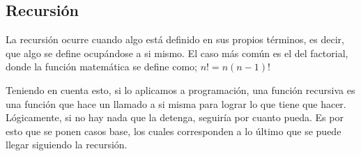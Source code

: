 \documentclass[letterpaper]{article}
\begin{document}
  \subsection{Recursi\'on}
  La recursi\'on ocurre cuando algo est\'a definido en sus propios t\'erminos,
  es decir, que algo se define ocup\'andose a si mismo. El caso m\'as com\'un es
  el del factorial, donde la funci\'on matem\'atica se define como;
  $n! = n(n-1)!$
  \par
  Teniendo en cuenta esto, si lo aplicamos a programaci\'on, una funci\'on recursiva
  es una funci\'on que hace un llamado a si misma para lograr lo que tiene que hacer.
  L\'ogicamente, si no hay nada que la detenga, seguir\'ia por cuanto pueda. Es por
  esto que se ponen casos base, los cuales corresponden a lo \'ultimo que se puede
  llegar siguiendo la recursi\'on.\par
\end{document}
